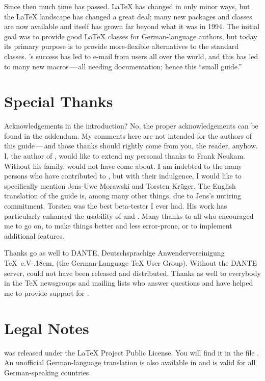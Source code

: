 Since then much time has passed. {\LaTeX} has changed in only minor
ways, but the {\LaTeX} landscape has changed a great deal; many new
packages and classes are now available and {\KOMAScript} itself has
grown far beyond what it was in 1994. The initial goal was to provide
good {\LaTeX} classes for German-language authors, but today its
primary purpose is to provide more-flexible alternatives to the
standard classes. {\KOMAScript}'s success has led to e-mail from users
all over the world, and this has led to many new macros\,---\,all
needing documentation; hence this ``small guide.''


\section{Special Thanks}
\label{sec:introduction.thanks}

Acknowledgements in the introduction? No, the proper acknowledgements can be
found in the addendum. My comments here are not intended for the authors of
this guide\,---\,and those thanks should rightly come from you, the reader,
anyhow. I, the author of {\KOMAScript}, would like to extend my personal thanks
to Frank Neukam.  Without his {\Script} family, {\KOMAScript} would not have
come about.  I am indebted to the many persons who have contributed to
{\KOMAScript}, but with their indulgence, I would like to specifically mention
Jens-Uwe Morawski and Torsten Kr\"uger. The English translation of the guide
is, among many other things, due to Jens's untiring commitment. Torsten was
the best beta-tester I ever had. His work has particularly enhanced the
usability of  and . Many thanks to all who
encouraged me to go on, to make things better and less error-prone, or to
implement additional features.

Thanks go as well to DANTE, Deutschsprachige
Anwendervereinigung {\TeX}~e.V\kern-.18em, (the German-Language {\TeX} User Group).
Without the DANTE server, {\KOMAScript} could not have been released and
distributed. Thanks as well to everybody in the {\TeX} newsgroups and mailing
lists who answer questions and have helped me to provide support for
{\KOMAScript}.


\section{Legal Notes}
\label{sec:introduction.legal}

{\KOMAScript} was released under the {\LaTeX} Project Public License. You
will find it in the file . An unofficial German-language
translation is also available in  and is valid for all
German-speaking countries.

